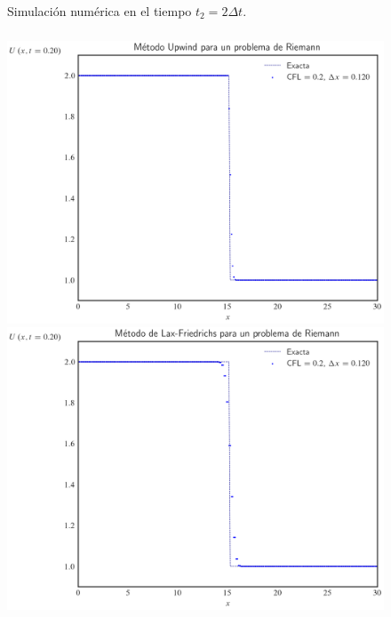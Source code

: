 \begin{frame}
\begin{figure}[ht!]
        \caption{Simulación numérica en el tiempo $t_{2}=2\Delta t$.}
        \label{fig:example2t2}
    \end{figure}

\end{frame}

\begin{frame}
    \frametitle{\secname}

    \begin{figure}[ht!]
        \centering
        \includegraphics[width=.30\paperwidth]{../snapshots/upwindheaviside1d-10.png}
        \includegraphics[width=.30\paperwidth]{../snapshots/lax-friedrichsheaviside1d-10.png}

\end{figure}
\end{frame}

